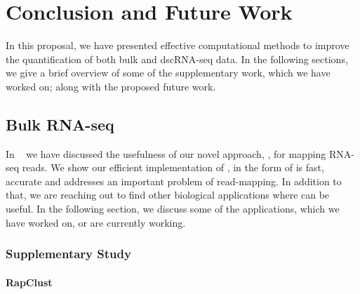 
\chapter{Conclusion and Future Work} %
\label{conclusion} %



In this proposal, we have presented effective computational methods to improve the quantification 
of both bulk and dscRNA-seq data. In the following sections, we
give a brief overview of some of the supplementary work, which we have worked on;
along with the proposed future work.

\section{Bulk RNA-seq}

In ~ we have discussed the usefulness of our novel approach, \qm, 
for mapping RNA-seq reads. We show our efficient implementation of \qm, in the 
form of \rapmap is fast, accurate and addresses an important problem of read-mapping. 
In addition to that, we are reaching out to find other biological applications where 
\rapmap can be useful. In the following section, we discuss some of the applications, 
which we have worked on, or are currently working. 

\subsection{Supplementary Study}
\subsubsection{RapClust~\citep{srivastava2016accurate}}

